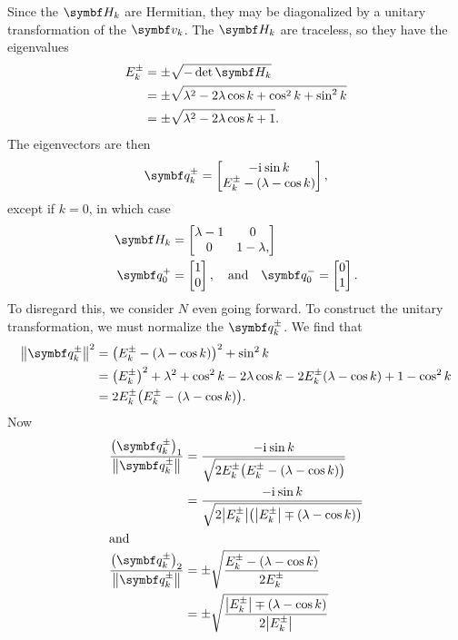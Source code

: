 \documentclass[../thesis.tex]{subfiles}
\begin{document}
Since the $\mq{H}_k$ are Hermitian, they may be diagonalized by a unitary
transformation of the $\vq{v}_k$. The $\mq{H}_k$ are traceless, so they have the
eigenvalues
\begin{align}
  E_k^\pm
  &= \pm\sqrt{-\det\mq{H}_k} \\
  &= \pm\sqrt{\lambda^2 - 2\lambda\cos k + \cos^2 k + \sin^2 k} \\
  &= \pm\sqrt{\lambda^2 - 2\lambda\cos k + 1}.
\end{align}
The eigenvectors are then
\begin{equation}
  \vq{q}_k^\pm
  = \bmqty{%
    -\im\sin k \\
    E_k^\pm - (\lambda - \cos k)
  },
\end{equation}
except if $k = 0$, in which case
\begin{align}
  \mq{H}_k
  &= \bmqty{%
    \lambda - 1 & 0 \\
    0 & 1 - \lambda,
  } \\
  \vq{q}_0^+
  &= \bmqty{1 \\ 0},
  \qand
  \vq{q}_0^-
  = \bmqty{0 \\ 1}.
\end{align}
To disregard this, we consider $N$ even going forward. To construct the unitary
transformation, we must normalize the $\vq{q}_k^\pm$. We find that
\begin{align}
  \norm{\vq{q}_k^\pm}^2
  &= {\qty(E_k^\pm - (\lambda - \cos k))}^2 + \sin^2 k \\
  &= {\qty(E_k^\pm)}^2 + \lambda^2 + \cos^2 k - 2\lambda\cos k - 2E_k^\pm(\lambda - \cos k) + 1 - \cos^2 k \\
  &= 2E_k^\pm \qty(E_k^\pm - (\lambda - \cos k)).
\end{align}
Now
\begin{align}
  \frac{{\qty(\vq{q}_k^\pm)}_1}{\norm{\vq{q}_k^\pm}}
  &= \frac{-\im\sin k}{\sqrt{2E_k^\pm \qty(E_k^\pm - (\lambda - \cos k))}} \\
  &= \frac{-\im\sin k}{\sqrt{2\abs{E_k^\pm} \qty(\abs{E_k^\pm} \mp (\lambda - \cos k))}}
  \\
  \shortintertext{and}
  \frac{{\qty(\vq{q}_k^\pm)}_2}{\norm{\vq{q}_k^\pm}}
  &= \pm\sqrt{\frac{E_k^\pm - (\lambda - \cos k)}{2E_k^\pm}} \\
  &= \pm\sqrt{\frac{\abs{E_k^\pm} \mp (\lambda - \cos k)}{2\abs{E_k^\pm}}}
\end{align}
\end{document}
